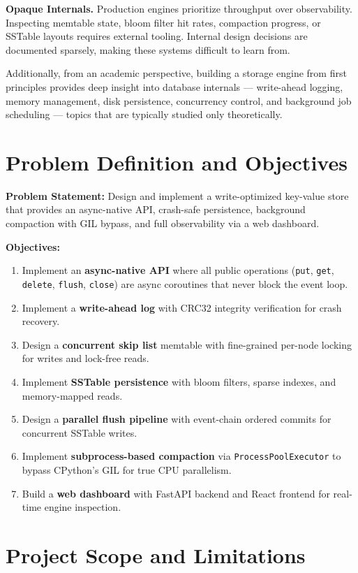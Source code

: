 \documentclass[oneside,a4paper,12pt]{book}
\begin{document}
\textbf{Opaque Internals.} Production engines prioritize throughput over observability. Inspecting memtable state, bloom filter hit rates, compaction progress, or SSTable layouts requires external tooling. Internal design decisions are documented sparsely, making these systems difficult to learn from.

Additionally, from an academic perspective, building a storage engine from first principles provides deep insight into database internals --- write-ahead logging, memory management, disk persistence, concurrency control, and background job scheduling --- topics that are typically studied only theoretically.

\section{Problem Definition and Objectives}

\textbf{Problem Statement:} Design and implement a write-optimized key-value store that provides an async-native API, crash-safe persistence, background compaction with GIL bypass, and full observability via a web dashboard.

\textbf{Objectives:}
\begin{enumerate}[leftmargin=2em]
    \item Implement an \textbf{async-native API} where all public operations (\texttt{put}, \texttt{get}, \texttt{delete}, \texttt{flush}, \texttt{close}) are async coroutines that never block the event loop.
    \item Implement a \textbf{write-ahead log} with CRC32 integrity verification for crash recovery.
    \item Design a \textbf{concurrent skip list} memtable with fine-grained per-node locking for writes and lock-free reads.
    \item Implement \textbf{SSTable persistence} with bloom filters, sparse indexes, and memory-mapped reads.
    \item Design a \textbf{parallel flush pipeline} with event-chain ordered commits for concurrent SSTable writes.
    \item Implement \textbf{subprocess-based compaction} via \texttt{ProcessPoolExecutor} to bypass CPython's GIL for true CPU parallelism.
    \item Build a \textbf{web dashboard} with FastAPI backend and React frontend for real-time engine inspection.
\end{enumerate}

\section{Project Scope and Limitations}
\end{document}
